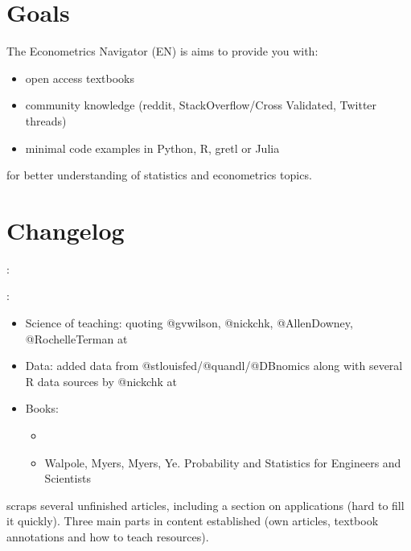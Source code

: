 \documentclass[letterpaper,10pt,english]{sphinxmanual}
\begin{document}
\section{Goals}
\label{\detokenize{index:goals}}
The Econometrics Navigator (EN) is aims to provide you with:
\begin{itemize}
\item {} 
open access textbooks

\item {} 
community knowledge (reddit, StackOverflow/Cross Validated, Twitter threads)

\item {} 
minimal code examples in Python, R, gretl or Julia

\end{itemize}

for better understanding of statistics and econometrics topics.


\section{Changelog}
\label{\detokenize{index:changelog}}
:

:
\begin{itemize}
\item {} 
Science of teaching: quoting @gvwilson, @nickchk, @AllenDowney, @RochelleTerman at 

\item {} 
Data: added data from @stlouisfed/@quandl/@DBnomics along with several R data sources by @nickchk at 

\item {} 
Books:
\begin{itemize}
\item {} 

\item {} 
Walpole, Myers, Myers, Ye. Probability and Statistics for Engineers and Scientists

\end{itemize}

\end{itemize}

 scraps several unfinished articles, including
a section on applications (hard to fill it quickly). Three main parts
in content established (own articles, textbook annotations and how to
teach resources).
\end{document}
